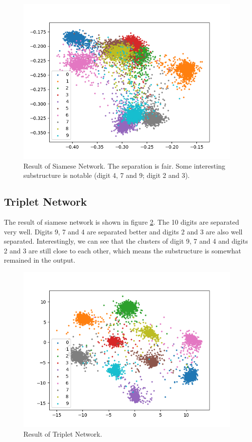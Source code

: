 \documentclass[10pt,twocolumn,letterpaper]{article}
\begin{document}
			\begin{figure}[htbp]
				\begin{center}
					\includegraphics[width=0.9\linewidth]{siamese_more_pos}
				\end{center}
				\caption{Result of Siamese Network. The separation is fair. Some interesting substructure is notable (digit 4, 7 and 9; digit 2 and 3).\label{fig:siamese_more_pos}}
			\end{figure}
			
		\subsection{Triplet Network}
			The result of siamese network is shown in figure \ref{fig:triplet}. The 10 digits are separated very well. Digits 9, 7 and 4 are separated better and digits 2 and 3 are also well separated. Interestingly, we can see that the clusters of digit 9, 7 and 4 and digits 2 and 3 are still close to each other, which means the substructure is somewhat remained in the output.
			\begin{figure}[htbp]
				\begin{center}
					\includegraphics[width=0.9\linewidth]{triplet}
				\end{center}
				\caption{Result of Triplet Network.\label{fig:triplet}}
			\end{figure}
\end{document}
